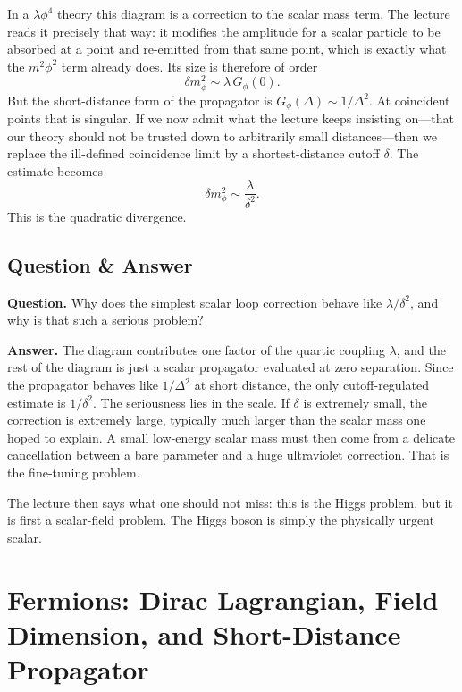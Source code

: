 In a \(\lambda \phi^4\) theory this diagram is a correction to the scalar mass term. The lecture reads it precisely that way: it modifies the amplitude for a scalar particle to be absorbed at a point and re-emitted from that same point, which is exactly what the \(m^2\phi^2\) term already does. Its size is therefore of order
\begin{equation}
\delta m_\phi^2 \sim \lambda\, G_\phi(0).
\end{equation}
But the short-distance form of the propagator is \(G_\phi(\Delta)\sim 1/\Delta^2\). At coincident points that is singular. If we now admit what the lecture keeps insisting on---that our theory should not be trusted down to arbitrarily small distances---then we replace the ill-defined coincidence limit by a shortest-distance cutoff \(\delta\). The estimate becomes
\begin{equation}
\delta m_\phi^2 \sim \frac{\lambda}{\delta^2}.
\end{equation}
This is the quadratic divergence.

\subsection{Question \& Answer}

\textbf{Question.} Why does the simplest scalar loop correction behave like \(\lambda/\delta^2\), and why is that such a serious problem?

\textbf{Answer.} The diagram contributes one factor of the quartic coupling \(\lambda\), and the rest of the diagram is just a scalar propagator evaluated at zero separation. Since the propagator behaves like \(1/\Delta^2\) at short distance, the only cutoff-regulated estimate is \(1/\delta^2\). The seriousness lies in the scale. If \(\delta\) is extremely small, the correction is extremely large, typically much larger than the scalar mass one hoped to explain. A small low-energy scalar mass must then come from a delicate cancellation between a bare parameter and a huge ultraviolet correction. That is the fine-tuning problem.

The lecture then says what one should not miss: this is the Higgs problem, but it is first a scalar-field problem. The Higgs boson is simply the physically urgent scalar.

\section{Fermions: Dirac Lagrangian, Field Dimension, and Short-Distance Propagator}

